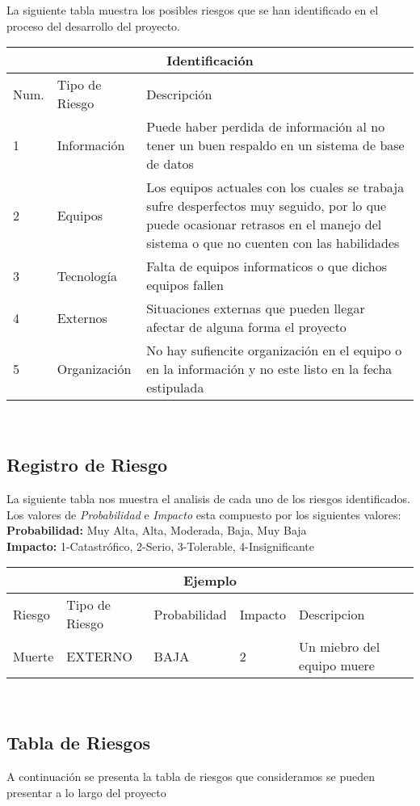 \documentclass[12pt]{article}
\begin{document}
La siguiente tabla muestra los posibles riesgos que se han identificado en el proceso del desarrollo del proyecto.\\
\begin{tabular}{ |p{2cm}||p{3cm}|p{6cm}| }
\hline
\multicolumn{3}{|c|}{Identificación} \\
\hline
Num. & Tipo de Riesgo & Descripción\\
\hline
1  & Información &  Puede haber perdida de información al no tener un buen respaldo en un sistema de base de datos\\
2  & Equipos  & Los equipos actuales con los cuales se trabaja sufre desperfectos muy seguido, por lo que puede ocasionar retrasos en el manejo del sistema o que no cuenten con las habilidades\\
3  & Tecnología &  Falta de equipos informaticos o que dichos equipos fallen\\
4  & Externos &  Situaciones externas que pueden llegar afectar de alguna forma el proyecto\\
5  & Organización & No hay sufiencite organización en el equipo o en la información y no este listo en la fecha estipulada\\
\hline
\end{tabular}\\

\subsection{Registro de Riesgo}
La siguiente tabla nos muestra el analisis de cada uno de los riesgos identificados. Los valores de \textit{Probabilidad} e \textit{Impacto} esta compuesto por los siguientes valores:\\
\textbf{Probabilidad:} Muy Alta, Alta, Moderada, Baja, Muy Baja\\
\textbf{Impacto:} 1-Catastrófico, 2-Serio, 3-Tolerable, 4-Insignificante\\

\begin{tabular}{ |p{2.5cm}||p{3cm}|p{3cm}|p{3cm}||p{3cm}|  }
\hline
\multicolumn{5}{|c|}{Ejemplo} \\
\hline
Riesgo & Tipo de Riesgo & Probabilidad & Impacto & Descripcion\\
\hline
Muerte & EXTERNO &BAJA&  2 & Un miebro del equipo muere\\
\hline
\end{tabular}\\

\subsection{Tabla de Riesgos}
A continuación se presenta la tabla de riesgos que consideramos se pueden presentar a lo largo del proyecto\\
\end{document}
